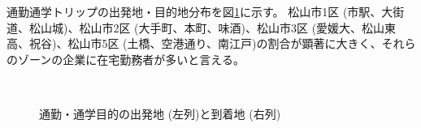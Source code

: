 \documentclass[a4paper,12pt, uplatex]{jsbook}
\begin{document}
通勤通学トリップの出発地・目的地分布を図\ref{fig:od_commute_remote}に示す。
松山市1区 (市駅、大街道、松山城)、松山市2区 (大手町、本町、味酒)、松山市3区 (愛媛大、松山東高、祝谷)、松山市5区 (土橋、空港通り、南江戸)の割合が顕著に大きく、それらのゾーンの企業に在宅勤務者が多いと言える。
%
\begin{figure}[htbp]
  \centering
  \\%
    \caption{通勤・通学目的の出発地 (左列)と到着地 (右列)}
  	\label{fig:od_commute_remote}
\end{figure}
\end{document}
